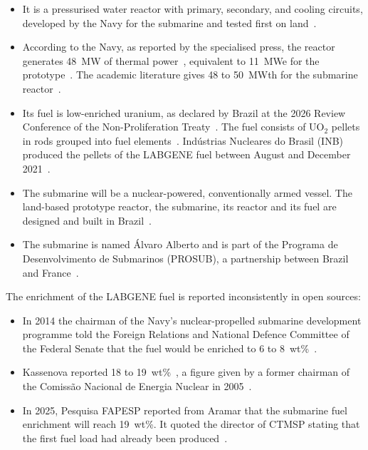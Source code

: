 \begin{itemize}
  \item It is a pressurised water reactor with primary, secondary, and
        cooling circuits, developed by the Navy for the submarine and
        tested first on land~\cite{ctmsp_labgene_2015}.

  \item According to the Navy, as reported by the specialised press, the
        reactor generates 48~MW of thermal
        power~\cite{demartini_nuclep_2022}, equivalent to 11~MWe for the
        prototype~\cite{galante_podernaval_2020}. The academic literature
        gives 48 to 50~MWth for the submarine
        reactor~\cite{dinizcosta_2017}.

  \item Its fuel is low-enriched uranium, as declared by Brazil at the
        2026 Review Conference of the Non-Proliferation
        Treaty~\cite{brazil_npt_wp13_2026}. The fuel consists of UO$_2$
        pellets in rods grouped into fuel
        elements~\cite{marinha_inb_labgene_2022,pereira_rmb_2023}.
        Indústrias Nucleares do Brasil (INB) produced the pellets of
        the LABGENE fuel between August and December
        2021~\cite{marinha_inb_labgene_2022}.

  \item The submarine will be a nuclear-powered, conventionally armed
        vessel. The land-based prototype reactor, the submarine, its
        reactor and its fuel are designed and built in
        Brazil~\cite{brazil_npt_wp13_2026}.

  \item The submarine is named Álvaro Alberto and is part of the
        Programa de Desenvolvimento de Submarinos (PROSUB), a partnership
        between Brazil and France~\cite{vasconcelos_fapesp_2025}.
\end{itemize}

The enrichment of the LABGENE fuel is reported inconsistently in open
sources:

\begin{itemize}
  \item In 2014 the chairman of the Navy's nuclear-propelled submarine
        development programme told the Foreign Relations and National
        Defence Committee of the Federal Senate that the fuel would be
        enriched to 6 to 8~wt\%~\cite{dinizcosta_2017}.

  \item Kassenova reported 18 to 19~wt\%~\cite{kassenova_2014}, a figure
        given by a former chairman of the Comissão Nacional de Energia
        Nuclear in 2005~\cite{dinizcosta_2017}.

  \item In 2025, Pesquisa FAPESP reported from Aramar that the submarine
        fuel enrichment will reach 19~wt\%. It quoted the director of
        CTMSP stating that the first fuel load had already been
        produced~\cite{vasconcelos_fapesp_2025}.
\end{itemize}

